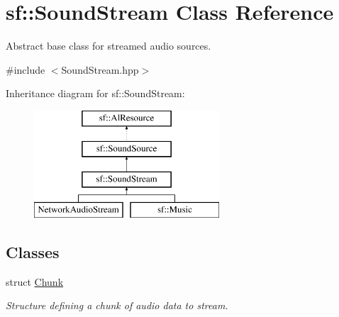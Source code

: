 \hypertarget{classsf_1_1_sound_stream}{}\section{sf\+:\+:Sound\+Stream Class Reference}
\label{classsf_1_1_sound_stream}


Abstract base class for streamed audio sources.  




{\ttfamily \#include $<$Sound\+Stream.\+hpp$>$}

Inheritance diagram for sf\+:\+:Sound\+Stream\+:\begin{figure}[H]
\begin{center}
\leavevmode
\includegraphics[height=4.000000cm]{classsf_1_1_sound_stream}
\end{center}
\end{figure}
\subsection*{Classes}
\begin{DoxyCompactItemize}
\item 
struct \hyperlink{structsf_1_1_sound_stream_1_1_chunk}{Chunk}
\begin{DoxyCompactList}\small\item\em Structure defining a chunk of audio data to stream. \end{DoxyCompactList}\end{DoxyCompactItemize}
